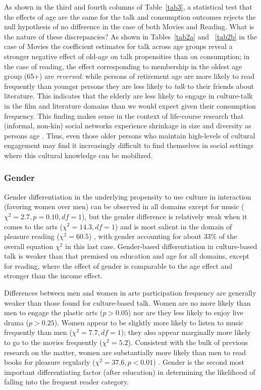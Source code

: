 \documentclass[11pt]{article}
\begin{document}
As shown in the third and fourth columns of Table~\ref{tab3}, a statistical test that the effects of age are the same for the talk and consumption outcomes rejects the null hypothesis of no difference in the case of both Movies and Reading.  What is the nature of these discrepancies?  As shown in Tables~\ref{tab2a} and ~\ref{tab2b} in the case of Movies the coefficient estimates for talk across age groups reveal a stronger negative effect of old-age on talk propensities than on consumption; in the case of reading, the effect corresponding to membership in the oldest age group (65+) are \emph{reversed}: while persons of retirement age are more likely to read frequently than younger persons they are less likely to \emph{talk} to their friends about literature.  This indicates that the elderly are less likely to engage in culture-talk in the film and literature domains than we would expect given their consumption frequency.  This finding makes sense in the context of life-course research that (informal, non-kin) social networks experience shrinkage in size and diversity as persons age \citep{marsden87, cornwell_etal08}.  Thus, even those older persons who maintain high-levels of cultural engagement may find it increasingly difficult to find themselves in social settings where this cultural knowledge can be mobilized.

\subsubsection{Gender}
Gender differentiation in the underlying propensity to use culture in interaction (favoring women over men) can be observed in all domains except for music ($\chi^{2}=2.7, p=0.10, df=1$), but the gender difference is relatively weak when it comes to the arts ($\chi^{2}=14.3, df = 1$) and is most salient in the domain of pleasure reading ($\chi^{2}=60.5$) \citep{long03, tepper00}, with gender accounting for about 33\% of the overall equation $\chi^{2}$ in this last case.   Gender-based differentiation in culture-based talk is weaker than that premised on education and age for all domains, except for reading, where the effect of gender is comparable to the age effect and stronger than the income effect.

Differences between men and women in arts participation frequency are generally weaker than those found for culture-based talk.  Women are no more likely than men to engage the plastic arts ($p>0.05$) nor are they less likely to enjoy live drama ($p>0.25$). Women appear to be slightly more likely to listen to music frequently than men ($\chi^{2}=7.7, df=1$); they also appear marginally more likely to go to the movies frequently ($\chi^{2}=5.2$).  Consistent with the bulk of previous research on the matter, women are substantially more likely than men to read books for pleasure regularly ($\chi^{2}=37.6, p<0.01$) \citep{tepper00}.  Gender is the second most important differentiating factor (after education) in determining the likelihood of falling into the frequent reader category.
\end{document}
